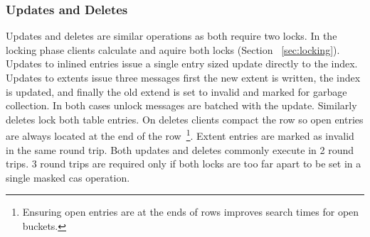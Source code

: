 


\subsubsection{Updates and Deletes}

Updates and deletes are similar operations as both require
two locks. In the locking phase clients calculate and aquire
both locks (Section ~\ref{sec:locking}). Updates to inlined entries
issue a single entry sized update directly to the index.
Updates to extents issue three messages first the new extent
is written, the index is updated, and finally the old extend
is set to invalid and marked for garbage collection. In both
cases unlock messages are batched with the update. Similarly
deletes lock both table entries. On deletes clients compact
the row so open entries are always located at the end of the
row~\footnote{Ensuring open entries are at the ends of rows
improves search times for open buckets.}. Extent entries are
marked as invalid in the same round trip. Both updates and
deletes commonly execute in 2 round trips. 3 round trips are
required only if both locks are too far apart to be set in a
single masked cas operation.

